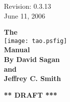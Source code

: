 \thispagestyle{empty}

\begin{flushright}
\large
  Revision: 0.3.13 \\
  June 11, 2006 \\
\end{flushright}

\vfill

{
\begin{center}
{\Huge \sf\bf The} \\
\vskip 0.1in
\texttt{[image: tao.psfig]} \\
\vskip 0.1in
{\Huge \sf\bf Manual} \\
\vskip 0.4in
{\Large \sf\bf By David Sagan \\ and \\ Jeffrey C. Smith} \\
\end{center}
}

\vskip 1in
\begin{center}
{\Huge \bf *** DRAFT ***}
\end{center}
\vfill
\break
